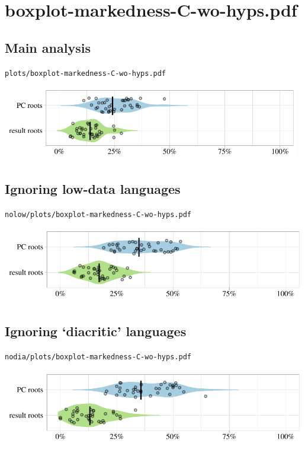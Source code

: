 \eject

\section{boxplot-markedness-C-wo-hyps.pdf}

\subsection{Main analysis}

\texttt{plots/boxplot-markedness-C-wo-hyps.pdf}

\includegraphics[width=0.98\textwidth]{../plots/boxplot-markedness-C-wo-hyps.pdf}

\subsection{Ignoring low-data languages}

\texttt{nolow/plots/boxplot-markedness-C-wo-hyps.pdf}

\includegraphics[width=1.0\textwidth]{../nolow/plots/boxplot-markedness-C-wo-hyps.pdf}

\subsection{Ignoring `diacritic' languages}

\texttt{nodia/plots/boxplot-markedness-C-wo-hyps.pdf}

\includegraphics[width=1.0\textwidth]{../nodia/plots/boxplot-markedness-C-wo-hyps.pdf}

